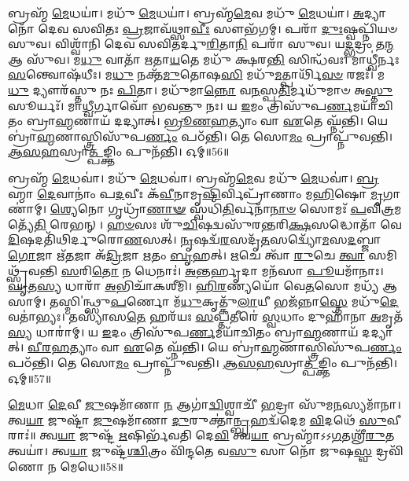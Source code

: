 𑌬𑍍𑌰𑌹𑍍𑌮᳴ \ul{𑌮𑍇}\-𑌧𑌯𑌾॑। 
𑌮𑌧𑍁᳴ \ul{𑌮𑍇}\-𑌧𑌯𑌾॑। 
𑌬𑍍𑌰𑌹𑍍𑌮᳴\-\ul{𑌮𑍇}\-𑌵 𑌮𑌧𑍁᳴ \ul{𑌮𑍇}\-𑌧𑌯𑌾॑। 
\-\ul{𑌅}\-𑌦𑍍𑌯𑌾 𑌨𑍋᳴ 𑌦𑍇𑌵 𑌸𑌵𑌿𑌤𑌃 \ul{𑌪𑍍𑌰}\-𑌜𑌾𑌵᳴𑌥𑍍𑌸𑌾\-\ul{𑌵𑍀𑌃} 𑌸𑍗𑌭᳴𑌗𑌮𑍍। 
𑌪𑌰𑌾᳴ \ul{𑌦𑍁𑌃}\-𑌷𑍍𑌵𑌪𑍍𑌨𑌿᳴𑌯𑍞 𑌸𑍁𑌵। 
𑌵𑌿𑌶𑍍𑌵𑌾᳴𑌨𑌿 𑌦𑍇𑌵 𑌸𑌵𑌿𑌤𑌰𑍍𑌦𑍁\-\ul{𑌰𑌿}\-𑌤𑌾\-\ul{𑌨𑌿} 𑌪𑌰𑌾᳴ 𑌸𑍁𑌵। 
𑌯\-\ul{𑌦𑍍𑌭}\-𑌦𑍍𑌰𑌂 𑌤\-\ul{𑌨𑍍𑌮} 𑌆 𑌸𑍁᳴𑌵। 
𑌮\-\ul{𑌧𑍁} 𑌵𑌾𑌤𑌾᳴ 𑌋𑌤𑌾\-\ul{𑌯}\-𑌤𑍇 𑌮𑌧𑍁᳴ 𑌕𑍍𑌷𑌰\-\ul{𑌨𑍍𑌤𑌿} 𑌸𑌿𑌨𑍍𑌧᳴𑌵𑌃। 
𑌮𑌾𑌧𑍍𑌵𑍀॑𑌰𑍍𑌨𑌃 \ul{𑌸}\-𑌨𑍍𑌤𑍍𑌵𑍋𑌷᳴𑌧𑍀𑌃। 
𑌮\-\ul{𑌧𑍁} 𑌨𑌕𑍍𑌤᳴\-\ul{𑌮𑍁}\-𑌤𑍋𑌷\-\ul{𑌸𑌿} 𑌮𑌧𑍁᳴\-\ul{𑌮}\-𑌤𑍍𑌪𑌾𑌰𑍍𑌥𑌿᳴\-\ul{𑌵}\-\-\ul{𑍞} 𑌰𑌜𑌃᳴। 
𑌮\-\ul{𑌧𑍁} 𑌦𑍍𑌯𑍗𑌰᳴𑌸𑍍𑌤𑍁 𑌨𑌃 \ul{𑌪𑌿}\-𑌤𑌾। 
𑌮𑌧𑍁᳴𑌮𑌾\-\ul{𑌨𑍍𑌨𑍋} 𑌵\-\ul{𑌨}\-𑌸𑍍𑌪\-\ul{𑌤𑌿}\-𑌰𑍍𑌮𑌧𑍁᳴𑌮𑌾𑍞 𑌅\-\ul{𑌸𑍍𑌤𑍁} 𑌸𑍂𑌰𑍍𑌯𑌃᳴। 
𑌮𑌾\-\ul{𑌧𑍍𑌵𑍀}\-𑌰𑍍𑌗𑌾𑌵𑍋᳴ 𑌭𑌵𑌨𑍍𑌤𑍁 𑌨𑌃। 
𑌯 \ul{𑌇}\-𑌮𑌂 𑌤𑍍𑌰𑌿𑌸𑍁᳴𑌪\-\ul{𑌰𑍍𑌣}\-𑌮𑌯𑌾᳴𑌚𑌿𑌤𑌂 𑌬𑍍𑌰𑌾\-\ul{𑌹𑍍𑌮}\-𑌣𑌾𑌯᳴ 𑌦𑌦𑍍𑌯𑌾𑌤𑍍। 
\-\ul{𑌭𑍍𑌰𑍂}\-\-\ul{𑌣}\-\-\ul{𑌹}\-𑌤𑍍𑌯𑌾𑌂 𑌵𑌾 \ul{𑌏}\-𑌤𑍇 𑌘𑍍𑌨᳴𑌨𑍍𑌤𑌿। 
𑌯𑍇 𑌬𑍍𑌰𑌾॑\-\ul{𑌹𑍍𑌮}\-𑌣𑌾𑌸𑍍𑌤𑍍𑌰𑌿𑌸𑍁᳴𑌪\-\ul{𑌰𑍍𑌣𑌂} 𑌪𑌠᳴𑌨𑍍𑌤𑌿। 
𑌤𑍇 𑌸𑍋\-\ul{𑌮𑌂} 𑌪𑍍𑌰𑌾𑌪𑍍𑌨𑍁᳴𑌵𑌨𑍍𑌤𑌿। 
\-\ul{𑌆}\-\-\ul{𑌸}\-\-\ul{𑌹}\-𑌸𑍍𑌰𑌾\-\ul{𑌤𑍍𑌪}\-𑌙𑍍𑌕𑍍𑌤𑌿𑌂 𑌪𑍁𑌨᳴𑌨𑍍𑌤𑌿। 
𑌓𑌮𑍍॥56॥
\anuvakamend


𑌬𑍍𑌰𑌹𑍍𑌮᳴ \ul{𑌮𑍇}\-𑌧𑌵𑌾॑। 
𑌮𑌧𑍁᳴ \ul{𑌮𑍇}\-𑌧𑌵𑌾॑। 
𑌬𑍍𑌰𑌹𑍍𑌮᳴\-\ul{𑌮𑍇}\-𑌵 𑌮𑌧𑍁᳴ \ul{𑌮𑍇}\-𑌧𑌵𑌾॑। 
\-\ul{𑌬𑍍𑌰}\-𑌹𑍍𑌮𑌾 \ul{𑌦𑍇}\-𑌵𑌾𑌨𑌾𑌂॑ 𑌪\-\ul{𑌦}\-𑌵𑍀𑌃 𑌕᳴\-\ul{𑌵𑍀}\-𑌨𑌾𑌮𑍃\-\ul{𑌷𑌿}\-𑌰𑍍𑌵𑌿𑌪𑍍𑌰𑌾᳴𑌣𑌾𑌂 𑌮\-\ul{𑌹𑌿}\-𑌷𑍋 \ul{𑌮𑍃}\-𑌗𑌾𑌣𑌾॑𑌮𑍍। 
\-\ul{𑌶𑍍𑌯𑍇}\-𑌨𑍋 𑌗𑍃𑌧𑍍𑌰𑌾᳴\-\ul{𑌣𑌾}\-\-\ul{𑍟} 𑌸𑍍𑌵𑌧𑌿᳴\-\ul{𑌤𑌿}\-𑌰𑍍𑌵𑌨𑌾᳴\-\ul{𑌨𑌾}\-\-\ul{𑍞} 𑌸𑍋𑌮𑌃᳴ \ul{𑌪}\-𑌵𑌿\-\ul{𑌤𑍍𑌰}\-𑌮𑌤𑍍𑌯𑍇᳴\-\ul{𑌤𑌿} 𑌰𑍇𑌭𑌨𑍍। 
\-\ul{𑌹}\-\-\ul{𑍞}\-𑌸𑌃 𑌶𑍁᳴\-\ul{𑌚𑌿}\-𑌷𑌦𑍍𑌵𑌸𑍁᳴𑌰𑌨𑍍𑌤𑌰𑌿\-\ul{𑌕𑍍𑌷}\-𑌸𑌦𑍍𑌧𑍋𑌤𑌾᳴ 𑌵𑍇\-\ul{𑌦𑌿}\-𑌷𑌦𑌤𑌿᳴𑌥𑌿𑌰𑍍𑌦𑍁𑌰𑍋\-\ul{𑌣}\-𑌸𑌤𑍍। 
\-\ul{𑌨𑍃}\-𑌷𑌦𑍍𑌵᳴\-\ul{𑌰}\-𑌸𑌦𑍃᳴\-\ul{𑌤}\-𑌸𑌦𑍍𑌵𑍍𑌯𑍋᳴\-\ul{𑌮}\-𑌸\-\ul{𑌦}\-𑌬𑍍𑌜𑌾 \ul{𑌗𑍋}\-𑌜𑌾 𑌋᳴\-\ul{𑌤}\-𑌜𑌾 𑌅᳴\-\ul{𑌦𑍍𑌰𑌿}\-𑌜𑌾 \ul{𑌋}\-𑌤𑌂 \ul{𑌬𑍃}\-𑌹𑌤𑍍। 
\-\ul{𑌋}\-𑌚𑍇 𑌤𑍍𑌵𑌾᳴ \ul{𑌰𑍁}\-𑌚𑍇 \ul{𑌤𑍍𑌵𑌾} 𑌸𑌮𑌿𑌥𑍍𑌸𑍍𑌰᳴𑌵𑌨𑍍𑌤𑌿 \ul{𑌸}\-𑌰𑌿\-\ul{𑌤𑍋} 𑌨 𑌧𑍇𑌨𑌾𑌃॑। 
\-\ul{𑌅}\-𑌨𑍍𑌤𑌰𑍍\mbox{}\-\ul{𑌹𑍃}\-𑌦𑌾 𑌮𑌨᳴𑌸𑌾 \ul{𑌪𑍂}\-𑌯𑌮𑌾᳴𑌨𑌾𑌃। 
\-\ul{𑌘𑍃}\-𑌤\-\ul{𑌸𑍍𑌯} 𑌧𑌾𑌰𑌾᳴ \ul{𑌅}\-𑌭𑌿𑌚𑌾᳴𑌕𑌶𑍀𑌮𑌿। 
\-\ul{𑌹𑌿}\-\-\ul{𑌰}\-𑌣𑍍𑌯𑌯𑍋᳴ 𑌵𑍇\-\ul{𑌤}\-𑌸𑍋 𑌮𑌧𑍍𑌯᳴ 𑌆𑌸𑌾𑌮𑍍। 
\mbox{𑌤𑌸𑍍𑌮𑌿 ॑\hspace{-1.25ex}𑌨𑍍𑌥𑍍𑌸𑍁}\-\-\ul{𑌪}\-𑌰𑍍𑌣𑍋 𑌮᳴\-\ul{𑌧𑍁}\-𑌕𑍃𑌤𑍍𑌕𑍁᳴\-\ul{𑌲𑌾}\-𑌯𑍀 𑌭𑌜᳴𑌨𑍍𑌨𑌾\-\ul{𑌸𑍍𑌤𑍇} 𑌮𑌧𑍁᳴\-\-\ul{𑌦𑍇}\-𑌵𑌤𑌾॑𑌭𑍍𑌯𑌃। 
𑌤𑌸𑍍𑌯𑌾᳴𑌸\-\ul{𑌤𑍇} 𑌹𑌰᳴𑌯𑌃 \ul{𑌸}\-𑌪𑍍𑌤𑌤𑍀𑌰𑍇॑ \ul{𑌸𑍍𑌵}\-𑌧𑌾𑌂 𑌦𑍁𑌹𑌾᳴𑌨𑌾 \ul{𑌅}\-𑌮𑍃𑌤᳴\-\ul{𑌸𑍍𑌯} 𑌧𑌾𑌰𑌾॑𑌮𑍍। 
𑌯 \ul{𑌇}\-𑌦𑌂 𑌤𑍍𑌰𑌿𑌸𑍁᳴𑌪\-\ul{𑌰𑍍𑌣}\-𑌮𑌯𑌾᳴𑌚𑌿𑌤𑌂 𑌬𑍍𑌰𑌾\-\ul{𑌹𑍍𑌮}\-𑌣𑌾𑌯᳴ 𑌦𑌦𑍍𑌯𑌾𑌤𑍍। 
\-\ul{𑌵𑍀}\-\-\ul{𑌰}\-\-\ul{𑌹}\-𑌤𑍍𑌯𑌾𑌂 𑌵𑌾 \ul{𑌏}\-𑌤𑍇 𑌘𑍍𑌨᳴𑌨𑍍𑌤𑌿। 
𑌯𑍇 𑌬𑍍𑌰𑌾॑\-\ul{𑌹𑍍𑌮}\-𑌣𑌾𑌸𑍍𑌤𑍍𑌰𑌿𑌸𑍁᳴𑌪\-\ul{𑌰𑍍𑌣𑌂} 𑌪𑌠᳴𑌨𑍍𑌤𑌿। 
𑌤𑍇 𑌸𑍋\-\ul{𑌮𑌂} 𑌪𑍍𑌰𑌾𑌪𑍍𑌨𑍁᳴𑌵𑌨𑍍𑌤𑌿। 
\-\ul{𑌆}\-\-\ul{𑌸}\-\-\ul{𑌹}\-𑌸𑍍𑌰𑌾\-\ul{𑌤𑍍𑌪}\-𑌙𑍍𑌕𑍍𑌤𑌿𑌂 𑌪𑍁𑌨᳴𑌨𑍍𑌤𑌿। 
𑌓𑌮𑍍॥57॥
\anuvakamend

\-\ul{𑌮𑍇}\-𑌧𑌾 \ul{𑌦𑍇}\-𑌵𑍀 \ul{𑌜𑍁}\-𑌷𑌮𑌾᳴𑌣𑌾 \ul{𑌨} 𑌆𑌗𑌾॑\-\ul{𑌦𑍍𑌵𑌿}\-𑌶𑍍𑌵𑌾𑌚𑍀᳴ \ul{𑌭}\-𑌦𑍍𑌰𑌾 𑌸𑍁᳴𑌮\-\ul{𑌨}\-𑌸𑍍𑌯𑌮𑌾᳴𑌨𑌾। 
𑌤𑍍𑌵\-\ul{𑌯𑌾} 𑌜𑍁𑌷𑍍𑌟𑌾᳴ \ul{𑌜𑍁}\-𑌷𑌮𑌾᳴𑌣𑌾 \ul{𑌦𑍁}\-𑌰𑍁𑌕𑍍𑌤𑌾॑\-\ul{𑌨𑍍𑌬𑍃}\-𑌹𑌦𑍍𑌵᳴𑌦𑍇𑌮 \ul{𑌵𑌿}\-𑌦𑌥𑍇᳴ \ul{𑌸𑍁}\-𑌵𑍀𑌰𑌾𑌃॑॥ 
𑌤𑍍𑌵\-\ul{𑌯𑌾} 𑌜𑍁𑌷𑍍𑌟᳴ \ul{𑌋}\-𑌷𑌿𑌰𑍍𑌭᳴𑌵𑌤𑌿 𑌦𑍇\-\ul{𑌵𑌿} 𑌤𑍍𑌵\-\ul{𑌯𑌾} 𑌬𑍍𑌰𑌹𑍍𑌮𑌾᳴𑌽𑌽\-\ul{𑌗}\-𑌤𑌶𑍍𑌰𑍀᳴\-\ul{𑌰𑍁}\-𑌤 𑌤𑍍𑌵𑌯𑌾॑। 
𑌤𑍍𑌵\-\ul{𑌯𑌾} 𑌜𑍁𑌷𑍍𑌟᳴\-\ul{𑌶𑍍𑌚𑌿}\-𑌤𑍍𑌰𑌂 𑌵𑌿᳴𑌨𑍍𑌦𑌤𑍇 𑌵\-\ul{𑌸𑍁} 𑌸𑌾 𑌨𑍋᳴ 𑌜𑍁𑌷\-\ul{𑌸𑍍𑌵} 𑌦𑍍𑌰𑌵𑌿᳴𑌣𑍋 𑌨 𑌮𑍇𑌧𑍇॥58॥
\anuvakamend


